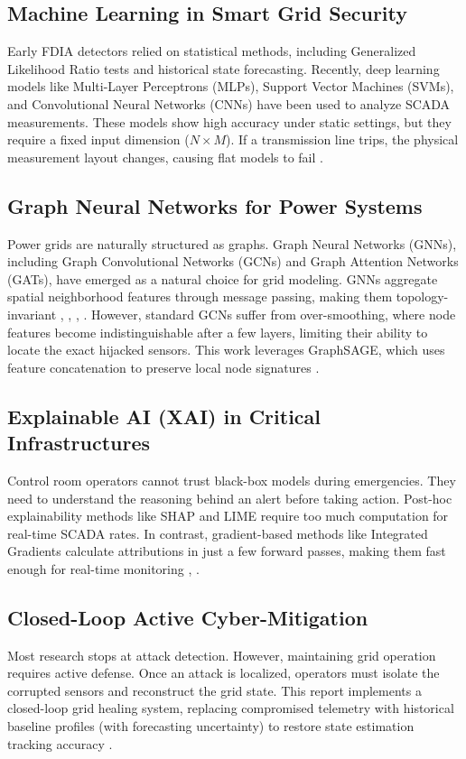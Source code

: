 \documentclass[journal]{IEEEtran}
\begin{document}
\subsection{Machine Learning in Smart Grid Security}
Early FDIA detectors relied on statistical methods, including Generalized Likelihood Ratio tests and historical state forecasting. Recently, deep learning models like Multi-Layer Perceptrons (MLPs), Support Vector Machines (SVMs), and Convolutional Neural Networks (CNNs) have been used to analyze SCADA measurements. These models show high accuracy under static settings, but they require a fixed input dimension ($N \times M$). If a transmission line trips, the physical measurement layout changes, causing flat models to fail \cite{b5}.

\subsection{Graph Neural Networks for Power Systems}
Power grids are naturally structured as graphs. Graph Neural Networks (GNNs), including Graph Convolutional Networks (GCNs) and Graph Attention Networks (GATs), have emerged as a natural choice for grid modeling. GNNs aggregate spatial neighborhood features through message passing, making them topology-invariant \cite{b2}, \cite{b6}, \cite{b12}, \cite{b14}. However, standard GCNs suffer from over-smoothing, where node features become indistinguishable after a few layers, limiting their ability to locate the exact hijacked sensors. This work leverages GraphSAGE, which uses feature concatenation to preserve local node signatures \cite{b8}.

\subsection{Explainable AI (XAI) in Critical Infrastructures}
Control room operators cannot trust black-box models during emergencies. They need to understand the reasoning behind an alert before taking action. Post-hoc explainability methods like SHAP and LIME require too much computation for real-time SCADA rates. In contrast, gradient-based methods like Integrated Gradients calculate attributions in just a few forward passes, making them fast enough for real-time monitoring \cite{b7}, \cite{b10}.

\subsection{Closed-Loop Active Cyber-Mitigation}
Most research stops at attack detection. However, maintaining grid operation requires active defense. Once an attack is localized, operators must isolate the corrupted sensors and reconstruct the grid state. This report implements a closed-loop grid healing system, replacing compromised telemetry with historical baseline profiles (with forecasting uncertainty) to restore state estimation tracking accuracy \cite{b13}.
\end{document}
